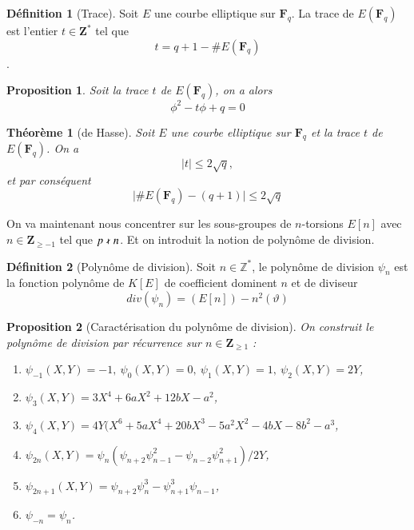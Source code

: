 \documentclass{article}%
\theoremstyle{plain}
\newtheorem{theoreme}{Théorème}[section]
\theoremstyle{definition}
\newtheorem{definition}{Définition}[section]
\theoremstyle{plain}
\newtheorem{proposition}{Proposition}[section]
\theoremstyle{plain}
\theoremstyle{remark}
\newcommand\fq{\mathbf{F}_{q}}
\begin{document}
\begin{definition}[Trace]
Soit $E$ une courbe elliptique sur $\fq$. La trace de $E(\fq)$ est l'entier $t\in\mathbf{Z^{*}}$ tel que  
\begin{equation}
t=q+1-\#E(\fq)
\label{trace}
\end{equation}.
\end{definition}

\begin{proposition}
Soit la trace $t$ de $E(\fq)$, on a alors 
\begin{equation}
\phi^{2} - t\phi + q = 0
\label{trace1}
\end{equation}
\end{proposition}

\begin{theoreme}[de Hasse]
Soit $E$ une courbe elliptique sur $\fq$ et la trace $t$ de $E(\fq)$.
On a \begin{equation}
\mid t\mid\leq 2\sqrt{q},
\label{hasse}
\end{equation}
et par conséquent
\begin{equation}
\mid\#E(\fq)-(q+1)\mid\leq 2\sqrt{q}
\label{hasse1}
\end{equation}
\end{theoreme}

On va maintenant nous concentrer sur les sous-groupes de $n$-torsions $E[n]$ avec $n\in\mathbf{Z}_{\geq -1}$ tel que $p\nshortmid n$. Et on introduit la notion de polynôme de division.

\begin{definition}[Polynôme de division]
Soit $n\in\mathbb{Z}^{*}$, le polynôme de division $\psi_{n}$ est la fonction polynôme de $K[E]$ de coefficient dominent $n$ et de diviseur $$div(\psi_{n})=(E[n])-n^{2}(\vartheta)$$
\end{definition}

\begin{proposition}[Caractérisation du polynôme de division]
On construit le polynôme de division par récurrence sur $n\in\mathbf{Z}_{\geq 1}$ :
\begin{enumerate}
\item $\psi_{-1}(X,Y)=-1,\ \psi_{0}(X,Y)=0,\ \psi_{1}(X,Y)=1,\ \psi_{2}(X,Y)=2Y$,
\item $\psi_{3}(X,Y)=3X^{4} + 6aX^{2} + 12bX - a^{2}$,
\item $\psi_{4}(X,Y)=4Y(X^{6} + 5aX^{4} + 20bX^{3} - 5a^{2}X^{2} - 4bX - 8b^{2} - a^{3}$,
\item $\psi_{2n}(X,Y)=\psi_{n}(\psi_{n+2}\psi_{n-1}^{2} - \psi_{n-2}\psi_{n+1}^{2})/2Y$,
\item $\psi_{2n+1}(X,Y)=\psi_{n+2}\psi_{n}^{3} - \psi_{n+1}^{3}\psi_{n-1}$,
\item $\psi_{-n}=\psi_{n}$.
\end{enumerate}
\end{proposition}
\end{document}
